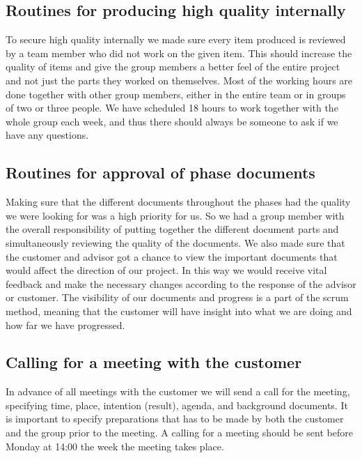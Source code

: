 \subsection{Routines for producing high quality internally}
To secure high quality internally we made sure every item produced is reviewed by a team member who did not work on the given item. This should increase the quality of items and give the group members a better feel of the entire project and not just the parts they worked on themselves. 
\newline
\newline
Most of the working hours are done together with other group members, either in the entire team or in groups of two or three people. We have scheduled 18 hours to work together with the whole group each week, and thus there should always be someone to ask if we have any questions.

\subsection{Routines for approval of phase documents}
Making sure that the different documents throughout the phases had the quality we were looking for was a high priority for us. So we had a group member with the overall responsibility of putting together the different document parts and simultaneously reviewing the quality of the documents.
\newline
\newline 
We also made sure that the customer and advisor got a chance to view the important documents that would affect the direction of our project. In this way we would receive vital feedback and make the necessary changes according to the response of the advisor or customer. 
\newline
\newline
The visibility of our documents and progress is a part of the scrum method, meaning that the customer will have insight into what we are doing and how far we have progressed.   

\subsection{Calling for a meeting with the customer}
In advance of all meetings with the customer we will send a call for the meeting, specifying time, place, intention (result), agenda, and background documents. It is important to specify preparations that has to be made by both the customer and the group prior to the meeting.
\newline
\newline
A calling for a meeting should be sent before Monday at 14:00 the week the meeting takes place.

